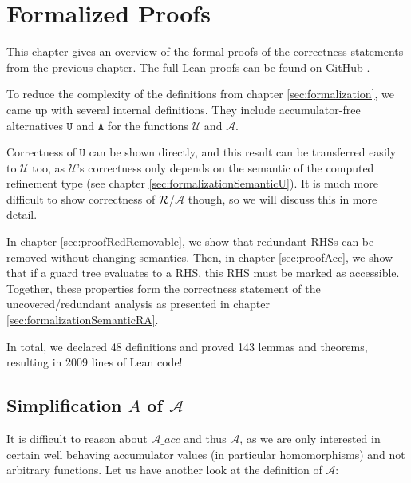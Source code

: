 \chapter{Formalized Proofs}\label{sec:proof}

This chapter gives an overview of the formal proofs of the correctness statements from the previous chapter.
The full Lean proofs can be found on GitHub \cite{leanProof}.


To reduce the complexity of the definitions from chapter \ref{sec:formalization}, we came up with several internal definitions.
They include accumulator-free alternatives $\mathtt{U}$ and $\mathtt{A}$ for the functions $\mathcal{U}$ and $\mathcal{A}$.


Correctness of $\mathtt{U}$ can be shown directly, and this result can be transferred easily to $\mathcal{U}$ too, as $\mathcal{U}$'s correctness only depends on the semantic of the computed refinement type (see chapter \ref{sec:formalizationSemanticU}).
It is much more difficult to show correctness of $\mathcal{R}$/$\mathcal{A}$ though, so we will discuss this in more detail.

In chapter \ref{sec:proofRedRemovable}, we show that redundant RHSs can be removed without changing semantics.
Then, in chapter \ref{sec:proofAcc}, we show that if a guard tree evaluates to a RHS, this RHS must be marked as accessible. Together, these properties form the correctness statement of the uncovered/redundant analysis as presented in chapter \ref{sec:formalizationSemanticRA}.

In total, we declared 48 definitions and proved 143 lemmas and theorems, resulting in 2009 lines of Lean code!

\section{Simplification $A$ of $\mathcal{A}$}\label{chap:A_A}

It is difficult to reason about $\mathcal{A}\_acc$ and thus $\mathcal{A}$,
as we are only interested in certain well behaving accumulator values (in particular homomorphisms) and not arbitrary functions.
Let us have another look at the definition of $\mathcal{A}$:

